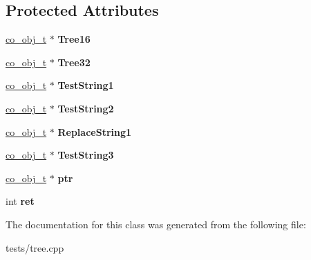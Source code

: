 \subsection*{Protected Attributes}
\begin{DoxyCompactItemize}
\item 
\hypertarget{classTreeTest_a262dbb122877911eb0a8a2c79abc891e}{\hyperlink{structco__obj__t}{co\+\_\+obj\+\_\+t} $\ast$ {\bfseries Tree16}}\label{classTreeTest_a262dbb122877911eb0a8a2c79abc891e}

\item 
\hypertarget{classTreeTest_a03999420e4ce83dd4440f255e592d8c0}{\hyperlink{structco__obj__t}{co\+\_\+obj\+\_\+t} $\ast$ {\bfseries Tree32}}\label{classTreeTest_a03999420e4ce83dd4440f255e592d8c0}

\item 
\hypertarget{classTreeTest_aa65307950ea381fcccf0c89c02d6e5e3}{\hyperlink{structco__obj__t}{co\+\_\+obj\+\_\+t} $\ast$ {\bfseries Test\+String1}}\label{classTreeTest_aa65307950ea381fcccf0c89c02d6e5e3}

\item 
\hypertarget{classTreeTest_a0eb58bddd27d6f74d1ec72bba967e3fc}{\hyperlink{structco__obj__t}{co\+\_\+obj\+\_\+t} $\ast$ {\bfseries Test\+String2}}\label{classTreeTest_a0eb58bddd27d6f74d1ec72bba967e3fc}

\item 
\hypertarget{classTreeTest_a2cadc4638b7aa4bebe3b233b5dad4bfc}{\hyperlink{structco__obj__t}{co\+\_\+obj\+\_\+t} $\ast$ {\bfseries Replace\+String1}}\label{classTreeTest_a2cadc4638b7aa4bebe3b233b5dad4bfc}

\item 
\hypertarget{classTreeTest_a30311c961c18b22dc91ecb9da8939c93}{\hyperlink{structco__obj__t}{co\+\_\+obj\+\_\+t} $\ast$ {\bfseries Test\+String3}}\label{classTreeTest_a30311c961c18b22dc91ecb9da8939c93}

\item 
\hypertarget{classTreeTest_a3ea8dde968a96f26b4d79082498e7812}{\hyperlink{structco__obj__t}{co\+\_\+obj\+\_\+t} $\ast$ {\bfseries ptr}}\label{classTreeTest_a3ea8dde968a96f26b4d79082498e7812}

\item 
\hypertarget{classTreeTest_ae7d983b14a020f8f7a4d661626f67863}{int {\bfseries ret}}\label{classTreeTest_ae7d983b14a020f8f7a4d661626f67863}

\end{DoxyCompactItemize}


The documentation for this class was generated from the following file\+:\begin{DoxyCompactItemize}
\item 
tests/tree.\+cpp\end{DoxyCompactItemize}
